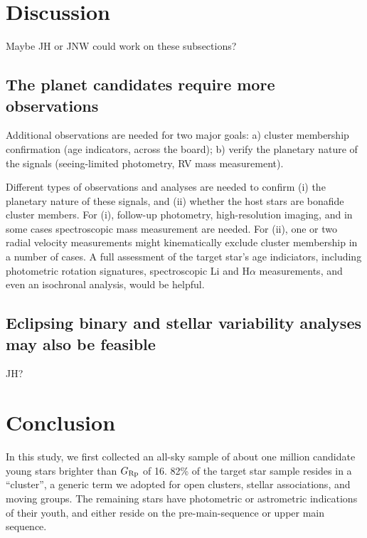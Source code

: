 \documentclass[12pt,twocolumn,tighten]{aastex62}
\begin{document}
\section{Discussion}
\label{sec:discussion}

Maybe JH or JNW could work on these subsections?

\subsection{The planet candidates require more observations}
Additional observations are needed for two major goals:
a) cluster membership confirmation
(age indicators, across the board);
b) verify the planetary nature of the signals
(seeing-limited photometry, RV mass measurement).

Different types of observations and analyses are needed to confirm 
(i) the planetary nature of these signals, and
(ii) whether the host stars are bonafide cluster members.
For (i), follow-up photometry, high-resolution imaging, and in some
cases spectroscopic mass measurement are needed.
For (ii), one or two radial velocity measurements might kinematically
exclude cluster membership in a number of cases.
A full assessment of the target star's age indiciators, including
photometric rotation signatures, spectroscopic Li and H$\alpha$
measurements, and even an isochronal analysis, would be helpful.

\subsection{Eclipsing binary and stellar variability analyses may also
be feasible}

JH?


\section{Conclusion}
\label{sec:conclusion}

In this study, we first collected an all-sky sample of about one million
candidate young stars brighter than $G_{\rm Rp}$ of 16.
82\% of the target star sample resides in a ``cluster'', a generic
term we adopted for open clusters, stellar associations, and moving
groups.
The remaining stars have photometric or astrometric indications of
their youth, and either reside on the pre-main-sequence or upper
main sequence.
\end{document}
